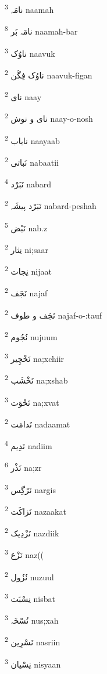 \documentclass[12pt]{article}
\begin{document}
\begin{RTL}
\begin{multicols}{5}
{\ur نامَہ}   \textsuperscript{3} naamah

{\ur نامَہ بَر}   \textsuperscript{8} naamah-bar

{\ur ناوُک}   \textsuperscript{3} naavuk

{\ur ناوُک فِگَن}   \textsuperscript{2} naavuk-figan

{\ur نای}   \textsuperscript{2} naay

{\ur نای و نوش}   \textsuperscript{2} naay-o-nosh

{\ur نایاب}   \textsuperscript{2} naayaab

{\ur نَباتی}   \textsuperscript{2} nabaatii

{\ur نَبَرْد}   \textsuperscript{4} nabard

{\ur نَبَرْد پیشَہ}   \textsuperscript{2} nabard-peshah

{\ur نَبْض}   \textsuperscript{5} nab.z

{\ur نِثار}   \textsuperscript{2} ni;saar

{\ur نِجات}   \textsuperscript{2} nijaat

{\ur نَجَف}   \textsuperscript{2} najaf

{\ur نَجَف و طوف}   \textsuperscript{2} najaf-o-:tauf

{\ur نُجُوم}   \textsuperscript{2} nujuum

{\ur نَخْچِیر}   \textsuperscript{3} na;xchiir

{\ur نَخْشَب}   \textsuperscript{2} na;xshab

{\ur نَخْوَت}   \textsuperscript{3} na;xvat

{\ur نَدامَت}   \textsuperscript{2} nadaamat

{\ur نَدِیم}   \textsuperscript{4} nadiim

{\ur نَذْر}   \textsuperscript{6} na;zr

{\ur نَرْگِس}   \textsuperscript{3} nargis

{\ur نَزاکَت}   \textsuperscript{2} nazaakat

{\ur نَزْدِیک}   \textsuperscript{2} nazdiik

{\ur نَزْع}   \textsuperscript{3} naz((

{\ur نُزُول}   \textsuperscript{2} nuzuul

{\ur نِسْبَت}   \textsuperscript{3} nisbat

{\ur نُسْخَہ}   \textsuperscript{3} nus;xah

{\ur نَسْرِین}   \textsuperscript{2} nasriin

{\ur نِسْیان}   \textsuperscript{3} nisyaan


\end{multicols}
\end{RTL}
\end{document}
